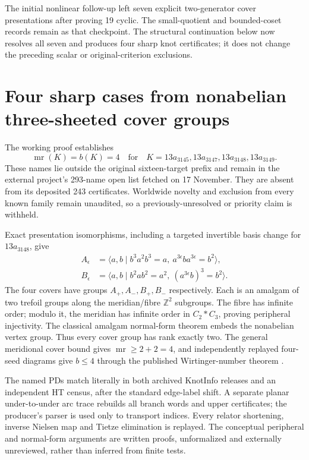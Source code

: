 \documentclass[11pt]{article}
\newcommand{\mr}{\operatorname{mr}}
\begin{document}
The initial nonlinear follow-up left seven explicit
two-generator cover presentations after proving 19 cyclic.
The small-quotient and bounded-coset records remain as that
checkpoint. The structural continuation below now resolves
all seven and produces four sharp knot certificates; it does
not change the preceding scalar or original-criterion
exclusions.

\section{Four sharp cases from nonabelian three-sheeted cover groups}

The working proof 
establishes
\[
 \mr(K)=b(K)=4\quad\text{for}\quad
 K=13a_{3145},13a_{3147},13a_{3148},13a_{3149}.
\]
These names lie outside the original sixteen-target prefix
and remain in the external project's 293-name open list
fetched on 17 November. They are absent from its deposited
243 certificates. Worldwide novelty and exclusion from every
known family remain unaudited, so a previously-unresolved
or priority claim is withheld.

Exact presentation isomorphisms, including a targeted
invertible basis change for $13a_{3148}$, give
\begin{align*}
 A_\epsilon&=\langle a,b\mid b^3a^2b^3=a,
                  \ a^{3\epsilon}ba^{3\epsilon}=b^2\rangle,\\
 B_\epsilon&=\langle a,b\mid b^2ab^2=a^2,
                  \ (a^{3\epsilon}b)^3=b^2\rangle.
\end{align*}
The four covers have groups $A_+,A_-,B_+,B_-$ respectively.
Each is an amalgam of two trefoil groups along the
meridian/fibre $\mathbb Z^2$ subgroups. The fibre has infinite order;
modulo it, the meridian has infinite order in $C_2*C_3$,
proving peripheral injectivity. The classical amalgam
normal-form theorem \cite{serre} embeds the nonabelian vertex
group. Thus every cover group has rank exactly two.
The general meridional cover bound gives $\mr\ge2+2=4$,
and independently replayed four-seed diagrams give $b\le4$
through the published Wirtinger-number theorem \cite{wirt}.

The named PDs match literally in both archived KnotInfo
releases and an independent HT census, after the standard
edge-label shift. A separate planar under-to-under arc
trace rebuilds all branch words and upper certificates;
the producer's parser is used only to transport indices.
Every relator shortening, inverse Nielsen map and Tietze
elimination is replayed. The conceptual peripheral and
normal-form arguments are written proofs, unformalized and
externally unreviewed, rather than inferred from finite tests.
\end{document}

